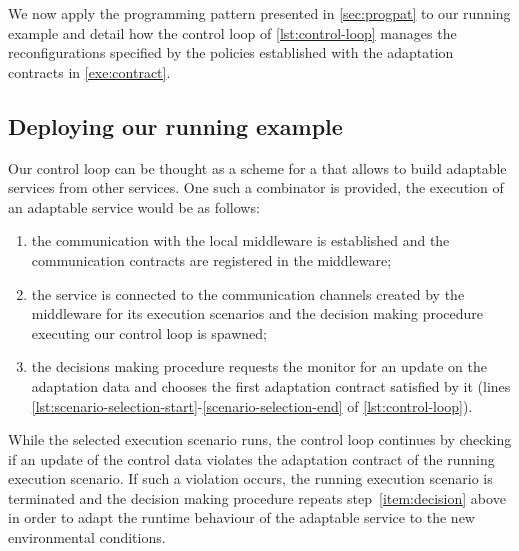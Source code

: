 
We now apply the programming pattern presented in \cref{sec:progpat}
to our running example and detail how the control loop of
\cref{lst:control-loop} manages the reconfigurations specified by the
policies established with the adaptation contracts in
\cref{exe:contract}.

\subsection{Deploying our running example}
%
Our control loop can be thought as a scheme for a 
that allows to build adaptable services from other services. One such
a combinator is provided, the execution of an adaptable service would
be as follows:
\begin{enumerate}
\item the communication with the local middleware is established and the communication contracts are registered in the middleware; 
\item the service is connected to the communication channels created
  by the middleware for its execution scenarios
  and the decision making procedure executing our control loop is
  spawned;
\item \label{item:decision} the decisions making procedure requests
  the monitor for an update on the adaptation data and chooses the
  first adaptation contract satisfied by it (lines
  \ref{lst:scenario-selection-start}-\ref{scenario-selection-end} of
  \cref{lst:control-loop}).
\end{enumerate}

While the selected execution scenario runs, the control loop continues
by checking if an update of the control data violates the adaptation
contract of the running execution scenario.
%
If such a violation occurs, the running execution scenario is
terminated and the decision making procedure repeats
step~\ref{item:decision} above in order to adapt the runtime behaviour
of the adaptable service to the new environmental conditions.

